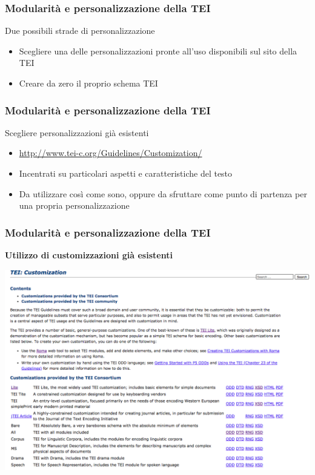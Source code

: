     \begin{frame}
        \frametitle{Modularità e personalizzazione della TEI}
        \addtocounter{nframe}{1}

        \begin{block}{Due possibili strade di personalizzazione}
                \begin{itemize}
                    \item Scegliere una delle personalizzazioni pronte all’uso disponibili sul sito della TEI
                    \item Creare da zero il proprio schema TEI
                \end{itemize} 
        \end{block}
        
    \end{frame}


    \begin{frame}
        \frametitle{Modularità e personalizzazione della TEI}
        \addtocounter{nframe}{1}

        \begin{block}{Scegliere personalizzazioni già esistenti}
                \begin{itemize}
                    \item \url{http://www.tei-c.org/Guidelines/Customization/}
                    \item Incentrati su particolari aspetti e caratteristiche del testo
                    \item Da utilizzare così come sono, oppure da sfruttare come punto di
                    partenza per una propria personalizzazione
                \end{itemize} 
        \end{block}
        
    \end{frame}

    \begin{frame}
        \frametitle{Modularità e personalizzazione della TEI}
        \addtocounter{nframe}{1}
        
        \textbf{Utilizzo di customizzazioni già esistenti}

         \begin{center}
            \includegraphics[width=.9\textwidth]{imgs/customization.png}
         \end{center}
       
        
    \end{frame}

